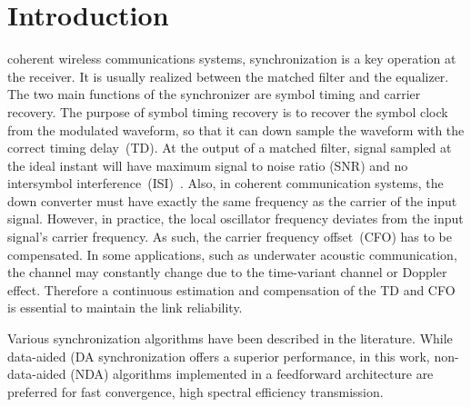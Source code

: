 \documentclass[journal,comsoc,onecolumn, 12pt,draftclsnofoot]{IEEEtran}
\begin{document}
\section{Introduction}
\label{sec:intro}
 coherent wireless communications systems, synchronization is a key operation at the receiver.
It is usually realized between the matched filter and the equalizer.
The two main functions of the synchronizer are symbol timing and carrier recovery.
The purpose of symbol timing recovery is to recover the symbol clock from the modulated waveform, so that it can down sample the waveform with the correct timing delay~(TD).
At the output of a matched filter, signal sampled at the ideal instant will have maximum signal to noise ratio (SNR) and no intersymbol interference~(ISI)~\cite{mengali1997synchronization}.
Also, in coherent communication systems, the down converter must have exactly the same frequency as the carrier of the input signal. 
However, in practice, the local oscillator frequency deviates from the input signal's carrier frequency.  
As such, the carrier frequency offset~(CFO) has to be compensated. 
In some applications, such as underwater acoustic communication, the channel may constantly change due to the time-variant channel or Doppler effect. 
Therefore a continuous estimation and compensation of the TD and CFO is essential to maintain the link reliability.

Various synchronization algorithms have been described in the literature.
While data-aided (DA synchronization offers a superior performance, in this work, non-data-aided (NDA) algorithms implemented in a feedforward architecture are preferred for fast convergence, high spectral efficiency transmission.  




\end{document}
